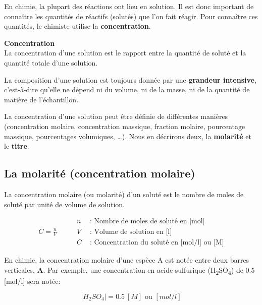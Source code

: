 \documentclass[
  11pt,
  a4paper,
  openany]{book}
\begin{document}
En chimie, la plupart des réactions ont lieu en solution. Il est donc important de connaître les quantités de réactifs (solutés) que l'on fait réagir. Pour connaître ces quantités, le chimiste utilise la \textbf{concentration}.

\begin{tcolorbox}
\textbf{Concentration}\\
La concentration d'une solution est le rapport entre la quantité de soluté et la quantité totale d'une solution.

\end{tcolorbox}

La composition d'une solution est toujours donnée par une \textbf{grandeur intensive}, c'est-à-dire qu'elle ne dépend ni du volume, ni de la masse, ni de la quantité de matière de l'échantillon.

La concentration d'une solution peut être définie de différentes manières (concentration molaire, concentration massique, fraction molaire, pourcentage massique, pourcentages volumiques, \ldots). Nous en décrirons deux, la \textbf{molarité} et le \textbf{titre}.

\subsection{La molarité (concentration molaire)}\label{la-molarituxe9-concentration-molaire}

La concentration molaire (ou molarité) d'un soluté est le nombre de moles de soluté par unité de volume de solution.

\[
\begin{split}
  C = \frac{n}{V}
\end{split}
\qquad
\begin{split}
  n &\text{ : Nombre de moles de soluté en [mol]} \\
  V &\text{ : Volume de solution en [l]} \\
  C &\text{ : Concentration du soluté en [mol/l] ou [M]}
\end{split}
\]

En chimie, la concentration molaire d'une espèce A est notée entre deux barres verticales, \textbf{\textbar A\textbar{}}. Par exemple, une concentration en acide sulfurique (H\textsubscript{2}SO\textsubscript{4}) de 0.5 {[}mol/l{]} sera notée:

\[ |H_2SO_4| = 0.5\ [M] \text{ ou } [mol/l] \]
\end{document}
